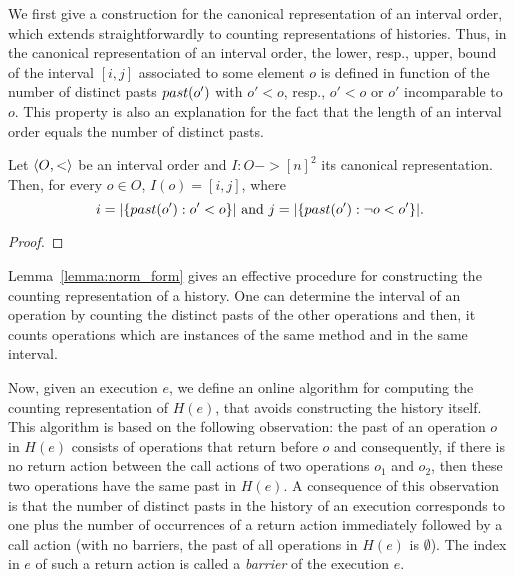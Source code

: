 We first give a construction for the canonical representation of an interval order, which extends straightforwardly to counting
representations of histories.
Thus, in the canonical representation of an interval order, the lower, resp., upper, bound of the interval $[i,j]$ associated 
to some element $o$ is defined in function of the number of distinct pasts $past({o'})$ with $o'<o$, resp., $o'<o$ or 
$o'$ incomparable to $o$.
%
This property is also an explanation for the fact that the length of an interval order equals the number of distinct pasts.

\begin{lemma}\label{lemma:norm_form}

Let $\left\langle {O,<} \right\rangle$ be an interval order and $I : O -> [n]^2$ its canonical representation. Then,
for every $o\in O$, $I(o)=[i,j]$, where 
\[
i= |{\{ past({o'}):o'<o \}}|\mbox{ and }j= |{\{ past({o'}):\neg o<o' \}}|.
\] 

\end{lemma}

\begin{proof}

\todo{}

\end{proof}

Lemma~\ref{lemma:norm_form} gives an effective procedure for constructing the counting representation of a history.
One can determine the interval of an operation by counting the distinct pasts of the other operations and then, it counts
operations which are instances of the same method and in the same interval.

Now, given an execution $e$, we define an online algorithm for computing the counting representation of $H(e)$, that
avoids constructing the history itself. This algorithm is based on the following observation: the past of an operation $o$ in $H(e)$ 
consists
of operations that return before $o$ and consequently, if there is no return action
between the call actions of two operations $o_1$ and $o_2$, then these two operations have the same past in $H(e)$.
A consequence of this observation is that the number of distinct pasts in the history of an execution corresponds 
to one plus the number of occurrences of a return action immediately followed by a call action (with no barriers, the
past of all operations in $H(e)$ is $\emptyset$). 
The index in $e$ of such a return action is called a \emph{barrier} of the execution $e$.

